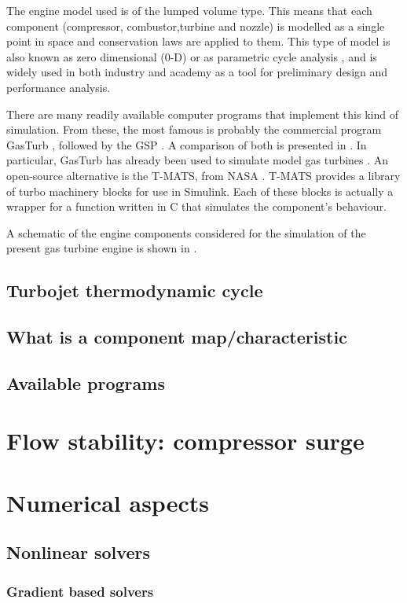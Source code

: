 \documentclass[tcc]{subfiles}
\begin{document}
The engine model used is of the lumped volume type. This means that each component 
 (compressor, combustor,turbine and nozzle)
 is modelled as a single point in space and conservation laws are applied to them.
 This type of model is also known as zero dimensional (0-D) or as parametric cycle analysis
 ,
 and is widely used in both industry and academy as a tool for preliminary design and 
 performance analysis. 

There are many readily available computer programs that implement this kind of simulation. 
From these, the most famous is probably the commercial program GasTurb \cite{GasTurb}, 
 
followed by the \gls{GSP} \cite{Visser2000}.
A comparison of both is presented in \textcite{GasTurbvsGSP}.
In particular, GasTurb has already been used to simulate model gas turbines 
 \cite{gao2011modelling}.
An open-source alternative is the \gls{T-MATS}, from NASA \cite{T-MATS}.
\gls{T-MATS} provides a library of turbo machinery blocks for use in Simulink. 
Each of these blocks is actually a wrapper for a function written in C 
 that simulates the component's behaviour.

A schematic of the engine components considered for the simulation of the present gas turbine engine is shown in .

\subsection{Turbojet thermodynamic cycle}
\subsection{What is a component map/characteristic}
\subsection{Available programs}
\section{Flow stability: compressor surge}
\section{Numerical aspects}
\subsection{Nonlinear solvers}
\subsubsection{Gradient based solvers}
\end{document}
